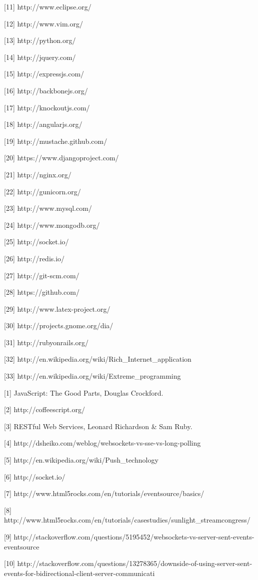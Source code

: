 \documentclass[doc,helv,longtable]{article}
\begin{document}
[11] http://www.eclipse.org/

[12] http://www.vim.org/

[13] http://python.org/

[14] http://jquery.com/

[15] http://expressjs.com/

[16] http://backbonejs.org/

[17] http://knockoutjs.com/

[18] http://angularjs.org/

[19] http://mustache.github.com/

[20] https://www.djangoproject.com/

[21] http://nginx.org/

[22] http://gunicorn.org/

[23] http://www.mysql.com/

[24] http://www.mongodb.org/

[25] http://socket.io/

[26] http://redis.io/

[27] http://git-scm.com/

[28] https://github.com/

[29] http://www.latex-project.org/

[30] http://projects.gnome.org/dia/

[31] http://rubyonrails.org/

[32] http://en.wikipedia.org/wiki/Rich_Internet_application

[33] http://en.wikipedia.org/wiki/Extreme_programming

[1] JavaScript: The Good Parts, Douglas Crockford.

[2] http://coffeescript.org/

[3] RESTful Web Services, Leonard Richardson & Sam Ruby.

[4] http://dsheiko.com/weblog/websockets-vs-sse-vs-long-polling

[5] http://en.wikipedia.org/wiki/Push_technology

[6] http://socket.io/

[7] http://www.html5rocks.com/en/tutorials/eventsource/basics/

[8] http://www.html5rocks.com/en/tutorials/casestudies/sunlight_streamcongress/

[9] http://stackoverflow.com/questions/5195452/websockets-vs-server-sent-events-eventsource

[10] http://stackoverflow.com/questions/13278365/downside-of-using-server-sent-events-for-bidirectional-client-server-communicati 
\end{document}
